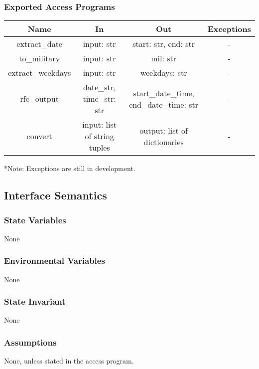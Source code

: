 \documentclass[12pt, titlepage]{article}
\begin{document}
\subsubsection{Exported Access Programs}
\begin{tabular}[pos]{|c|c|c|c|}
	\hline
	\textbf{Name}& \textbf{In} &  \textbf{Out} & \textbf{Exceptions} \\ \hline
	extract\_date & input: str & start: str, end: str & -\\
	\hline
	to\_military & input: str & mil: str & -\\
	\hline
	extract\_weekdays & input: str & weekdays: str & - \\
	\hline 
	rfc\_output & date\_str, time\_str: str & start\_date\_time, end\_date\_time: str & - \\
	\hline 
	convert & input: list of string tuples & output: list of dictionaries & - \\
	\hline 
\end{tabular}
*Note: Exceptions are still in development.
\subsection{Interface Semantics}
\subsubsection{State Variables}
None
\subsubsection{Environmental Variables}
None
\subsubsection{State Invariant}
None
\subsubsection{Assumptions}
None, unless stated in the access program.
\end{document}
